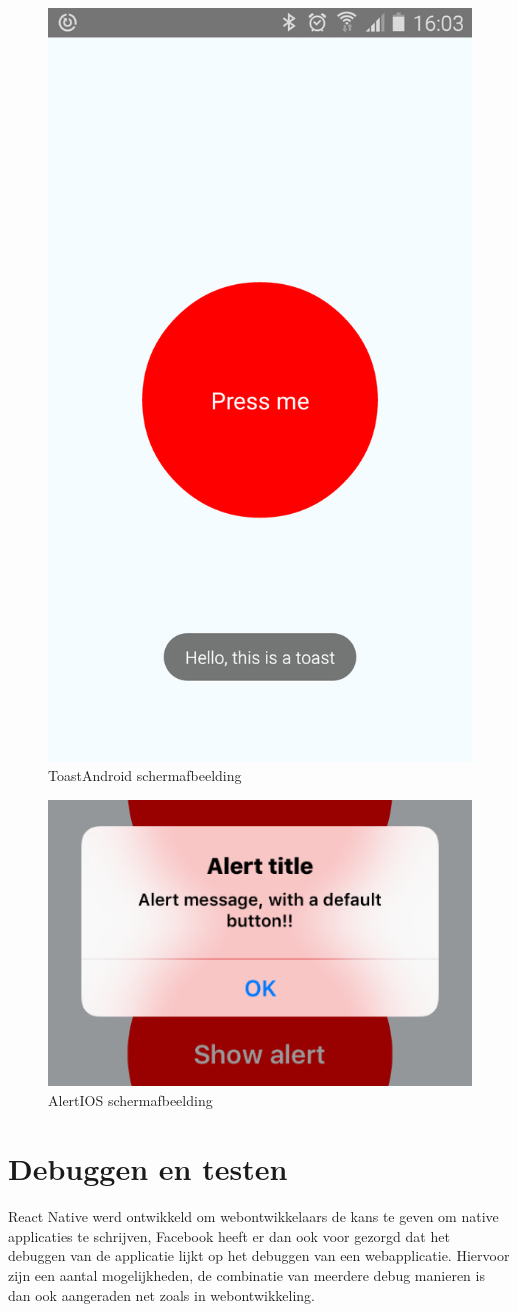 
\begin{figure}%
\centering
\includegraphics[width=0.5\columnwidth]{img/toast.png}%
\caption{ToastAndroid schermafbeelding}%
\label{fig:toast}%
\end{figure}


\begin{figure}%
\centering
\includegraphics[width=0.5\columnwidth]{img/alert.png}%
\caption{AlertIOS schermafbeelding}%
\label{fig:alert}%
\end{figure}

\section{Debuggen en testen}
React Native werd ontwikkeld om webontwikkelaars de kans te geven om native applicaties te schrijven, Facebook heeft er dan ook voor gezorgd dat het debuggen van de applicatie lijkt op het debuggen van een webapplicatie. Hiervoor zijn een aantal mogelijkheden, de combinatie van meerdere debug manieren is dan ook aangeraden net zoals in webontwikkeling. 

